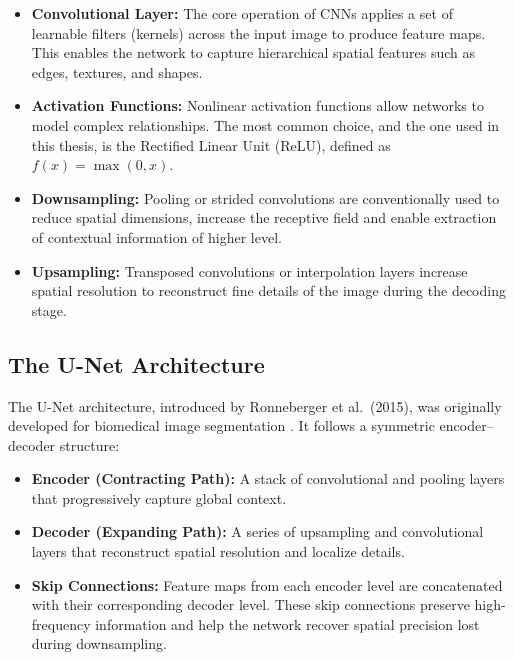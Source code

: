 \begin{itemize}
    \item \textbf{Convolutional Layer:} 
    The core operation of CNNs applies a set of learnable filters (kernels) across the input image to produce feature maps. 
    This enables the network to capture hierarchical spatial features such as edges, textures, and shapes.
    
    \item \textbf{Activation Functions:} Nonlinear activation functions allow networks to model complex relationships. 
    The most common choice, and the one used in this thesis, is the Rectified Linear Unit (ReLU), defined as \( f(x) = \max(0, x) \).
    
    \item \textbf{Downsampling:} 
    Pooling or strided convolutions are conventionally used to reduce spatial dimensions, increase the receptive field and enable extraction of contextual information of higher level.
    
    \item \textbf{Upsampling:} 
    Transposed convolutions or interpolation layers increase spatial resolution to reconstruct fine details of the image during the decoding stage.
\end{itemize}

\subsection{The U-Net Architecture}

The U-Net architecture, introduced by Ronneberger et al.\ (2015), was originally developed for biomedical image segmentation \cite{ronneberger2015unet}. 
It follows a symmetric encoder–decoder structure:

\begin{itemize}
    \item \textbf{Encoder (Contracting Path):} 
    A stack of convolutional and pooling layers that progressively capture global context.
    
    \item \textbf{Decoder (Expanding Path):} 
    A series of upsampling and convolutional layers that reconstruct spatial resolution and localize details.
    
    \item \textbf{Skip Connections:} 
    Feature maps from each encoder level are concatenated with their corresponding decoder level. 
    These skip connections preserve high-frequency information and help the network recover spatial precision lost during downsampling.
\end{itemize}

